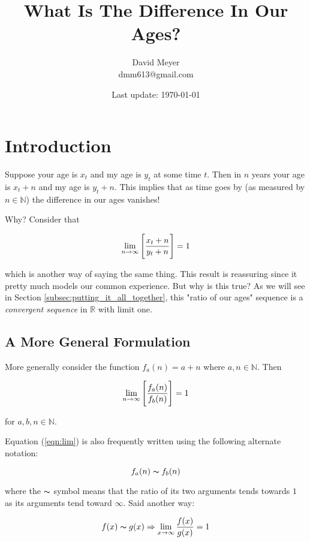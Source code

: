 \documentclass[11pt, oneside]{article}          %
\title{What Is The Difference In Our Ages?}
\author{David Meyer \\ dmm613@gmail.com}
\date{Last update: \today}
\theoremstyle{definition}
\begin{document}
\maketitle

\section{Introduction}
Suppose your age is $x_t$ and my age is $y_t$ at some time $t$.
Then in $n$ years your age is $x_t + n$ and my age is $y_t +
n$. This implies that as time goes by (as measured by $n \in
\mathbb{N}$) the difference in our ages vanishes!

\bigskip
\noindent
Why? Consider that 

\begin{equation*}
\centering
\lim\limits_{n \to \infty} \Bigg [ \frac{x_t + n}{y_t + n} \Bigg ]  = 1
\end{equation*}

\bigskip
\noindent
which is another way of saying the same thing. This result is
reassuring since it pretty much models our common experience. 
But why is this true? As we will see in Section
\ref{subsec:putting_it_all_together}, this "ratio of our ages"
sequence is a \emph{convergent sequence} in $\mathbb{R}$ with
limit one.


\subsection{A More General Formulation}
More generally consider the function $f_a(n) = a + n$ 
where $a,n \in \mathbb{N}$. Then 

\bigskip
\begin{equation}
\centering
\lim\limits_{n \to \infty} \Bigg [ \frac{f_a(n)}{f_b(n)} \Bigg ]  = 1
\label{eqn:lim}
\end{equation}

\bigskip
\noindent
for $a,b,n \in \mathbb{N}$. 

\bigskip
\noindent
Equation (\ref{eqn:lim}) is also frequently
written using the following alternate 
notation: 

\medskip
\begin{equation*}
f_a(n) \thicksim f_b(n)
 \end{equation*}

\bigskip
\noindent
where the $\thicksim$ symbol means that the ratio of its two
arguments tends towards $1$ as its arguments tend toward
$\infty$. Said another way:

\medskip
\begin{equation*}
f(x) \thicksim g(x) \Rightarrow \lim\limits_{x \to \infty} \dfrac{f(x)}{g(x)} = 1
\end{equation*}
\end{document}
